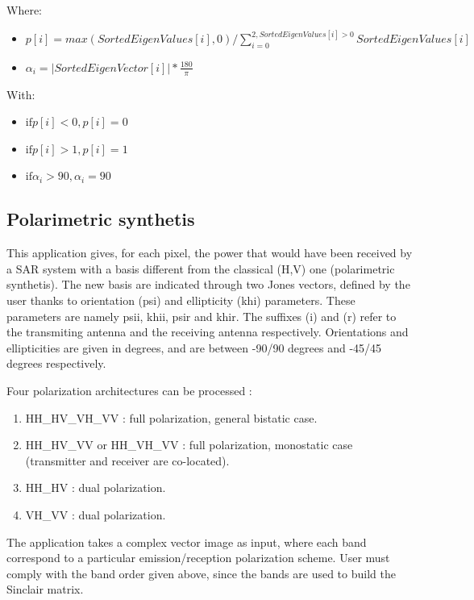 Where:
\begin{itemize}
\item $ p[i] = max(SortedEigenValues[i], 0) / \sum_{i=0}^{2, SortedEigenValues[i]>0} SortedEigenValues[i] $
\item $ \alpha_{i} = \left| SortedEigenVector[i] \right|* \frac{180}{\pi}$
\end{itemize}

With:
\begin{itemize}
\item $ \text{if} p[i] < 0, p[i]=0 $
\item $ \text{if} p[i] > 1, p[i]=1 $
\item $ \text{if} \alpha_{i} > 90, \alpha_{i}=90 $
\end{itemize}

\subsection{Polarimetric synthetis}\label{ssec:polsynth}

This application gives, for each pixel, the power that would have been received by a SAR system with a basis different from the classical (H,V) one (polarimetric synthetis). 
The new basis are indicated through two Jones vectors, defined by the user thanks to orientation (psi) and ellipticity (khi) parameters.
These parameters are namely psii, khii, psir and khir. The suffixes (i) and (r) refer to the transmiting antenna and the receiving antenna respectively.
Orientations and ellipticities are given in degrees, and are between -90/90 degrees and -45/45 degrees respectively. 

Four polarization architectures can be processed :
\begin{enumerate}
\item HH\_HV\_VH\_VV : full polarization, general bistatic case.
\item HH\_HV\_VV or HH\_VH\_VV : full polarization, monostatic case (transmitter and receiver are co-located).
\item HH\_HV : dual polarization.
\item VH\_VV : dual polarization.
\end{enumerate}
The application takes a complex vector image as input, where each band correspond to a particular emission/reception polarization scheme.
User must comply with the band order given above, since the bands are used to build the Sinclair matrix.

